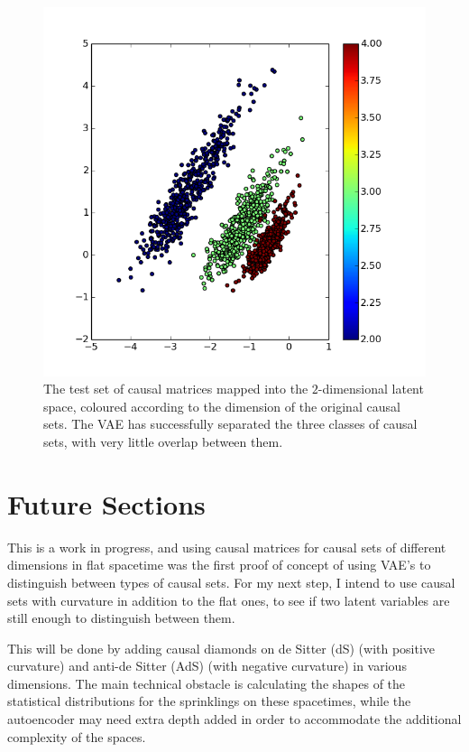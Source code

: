 \documentclass[letterpaper,10pt]{article}
\begin{document}
\begin{figure} [h]
\begin{center}
  \includegraphics[width=5in]{latent_encoding.png}
\end{center}
  \caption{
The test set of causal matrices mapped into the $2$-dimensional latent space, coloured according to the dimension of the original causal sets.  
The VAE has successfully separated the three classes of causal sets, with very little overlap between them.} \label{resultsfig}
\end{figure}

\section{Future Sections} \label{future}

This is a work in progress, and using causal matrices for causal sets of different dimensions in flat spacetime was the first proof of concept of using 
VAE's to distinguish between types of causal sets.  For my next step, I intend to use causal sets with curvature in addition to the flat ones, to see if 
two latent variables are still enough to distinguish between them.  

This will be done by adding causal diamonds on de Sitter (dS) (with positive curvature) and anti-de Sitter (AdS) (with negative curvature) 
in various dimensions.  The main technical obstacle is calculating the 
shapes of the statistical distributions for the sprinklings on these spacetimes, while the autoencoder may need extra depth added in order to accommodate 
the additional complexity of the spaces.
\end{document}
